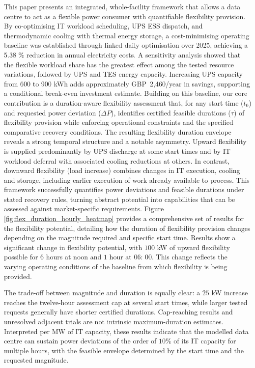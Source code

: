 \documentclass[lettersize,journal]{IEEEtran}
\providecommand{\DIFadd}[1]{{\color{blue}#1}}
\providecommand{\DIFaddbegin}{}
\providecommand{\DIFaddend}{}
\begin{document}
This paper presents an integrated, whole-facility framework that  \DIFaddbegin \DIFadd{allows a data centre to act as a flexible power consumer with }\DIFaddend quantifiable flexibility provision. By co-optimising IT workload scheduling,  \DIFaddbegin \DIFadd{UPS ESS }\DIFaddend dispatch, and thermodynamic cooling with thermal energy storage, a cost-minimising  \DIFaddbegin \DIFadd{operating baseline was established through linked daily optimisation over 2025}\DIFaddend , achieving a  \DIFaddbegin \DIFadd{5.38}\DIFaddend{} \% reduction in  \DIFaddbegin \DIFadd{annual electricity costs. A sensitivity analysis showed that the flexible workload share has the greatest effect among the tested resource variations, followed by UPS and TES energy capacity. Increasing UPS capacity from 600 to 900 kWh adds approximately GBP~2,460/year in savings, supporting a conditional break-even investment estimate. }\DIFaddend Building on this baseline, our core contribution is a duration-aware flexibility assessment that, for any start time ($t_0$) and requested power deviation ($\Delta P$),  \DIFaddbegin \DIFadd{identifies certified feasible durations }\DIFaddend ($\tau$) of flexibility provision while enforcing operational constraints and  \DIFaddbegin \DIFadd{the specified comparative recovery conditions}\DIFaddend . The resulting flexibility duration envelope reveals a strong temporal structure and a notable asymmetry. Upward flexibility  \DIFaddbegin \DIFadd{is supplied predominantly by UPS discharge at some start times and by IT workload deferral with associated cooling reductions at others. }\DIFaddend In contrast, downward flexibility (load increase)  \DIFaddbegin \DIFadd{combines changes in IT execution, cooling and storage, including earlier execution of work already available to process}\DIFaddend . This framework successfully quantifies  \DIFaddbegin \DIFadd{power deviations and feasible durations under stated recovery rules}\DIFaddend , turning abstract potential into  \DIFaddbegin \DIFadd{capabilities that can be assessed against market-specific requirements}\DIFaddend . Figure \ref{fig:flex_duration_hourly_heatmap} provides a comprehensive set of results for the flexibility potential, detailing how the duration of flexibility provision changes depending on the magnitude required and specific start time. Results show a significant change in flexibility potential, with $100$ kW of upward flexibility possible for  \DIFaddbegin \DIFadd{$6$ hours at noon and $1$ hour at $06$:}\DIFaddend{} $00$. This change reflects the varying operating conditions of the baseline from which flexibility is being provided. \DIFaddbegin \DIFadd{The trade-off between magnitude and duration is equally clear: a $25$ kW increase reaches the twelve-hour assessment cap at several start times, while larger tested requests generally have shorter certified durations. Cap-reaching results and unresolved adjacent trials are not intrinsic maximum-duration estimates. Interpreted per MW of IT capacity, these results indicate that the modelled data centre can sustain power deviations of the order of $10\%$ of its IT capacity for multiple hours, with the feasible envelope determined by the start time and the requested magnitude.

}\DIFaddend 
\end{document}
